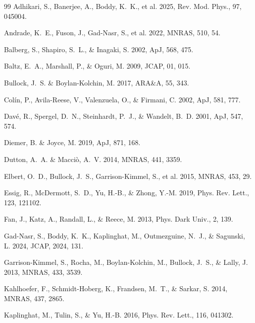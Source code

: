 \documentclass[12pt]{article}
\begin{document}
\begin{thebibliography}{99}
Adhikari, S., Banerjee, A., Boddy, K.~K., et al. 2025,
Rev. Mod. Phys., 97, 045004.

Andrade, K.~E., Fuson, J., Gad-Nasr, S., et al. 2022, MNRAS, 510, 54.

Balberg, S., Shapiro, S.~L., \& Inagaki, S. 2002, ApJ, 568, 475.

Baltz, E.~A., Marshall, P., \& Oguri, M. 2009, JCAP, 01, 015.

Bullock, J.~S. \& Boylan-Kolchin, M. 2017, ARA\&A, 55, 343.

Col\'in, P., Avila-Reese, V., Valenzuela, O., \& Firmani, C. 2002,
ApJ, 581, 777.

Dav\'e, R., Spergel, D.~N., Steinhardt, P.~J., \& Wandelt, B.~D. 2001,
ApJ, 547, 574.

Diemer, B. \& Joyce, M. 2019, ApJ, 871, 168.

Dutton, A.~A. \& Macci\`o, A.~V. 2014, MNRAS, 441, 3359.

Elbert, O.~D., Bullock, J.~S., Garrison-Kimmel, S., et al. 2015,
MNRAS, 453, 29.

Essig, R., McDermott, S.~D., Yu, H.-B., \& Zhong, Y.-M. 2019,
Phys. Rev. Lett., 123, 121102.

Fan, J., Katz, A., Randall, L., \& Reece, M. 2013,
Phys. Dark Univ., 2, 139.

Gad-Nasr, S., Boddy, K.~K., Kaplinghat, M., Outmezguine, N.~J., \&
Sagunski, L. 2024, JCAP, 2024, 131.

Garrison-Kimmel, S., Rocha, M., Boylan-Kolchin, M., Bullock, J.~S.,
\& Lally, J. 2013, MNRAS, 433, 3539.

Kahlhoefer, F., Schmidt-Hoberg, K., Frandsen, M.~T., \& Sarkar, S. 2014,
MNRAS, 437, 2865.

Kaplinghat, M., Tulin, S., \& Yu, H.-B. 2016,
Phys. Rev. Lett., 116, 041302.


\end{thebibliography}
\end{document}
